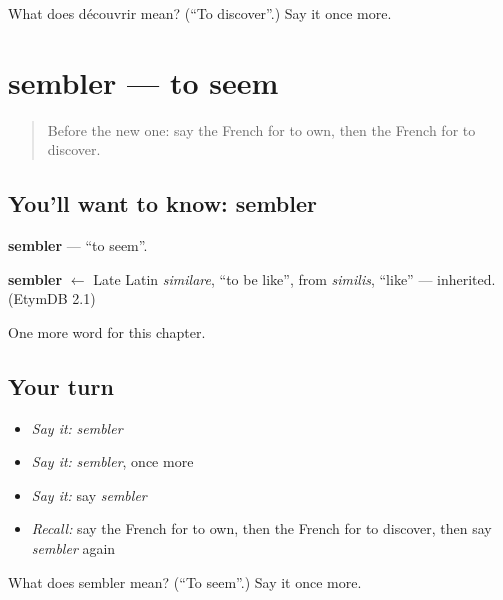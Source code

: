 \begin{tcolorbox}[breakable,colback=teal!4,colframe=teal!35!black,title={Before you move on}]
What does découvrir mean? (\textquotedblleft{}To discover\textquotedblright{}.) Say it once more.
\end{tcolorbox}
\section[sembler]{sembler — to seem}

\label{lesson:FR-C149-sembler}



\begin{quote}
Before the new one: say the French for to own, then the French for to discover.
\end{quote}

\subsection*{You'll want to know: sembler}
\textbf{sembler} — \textquotedblleft{}to seem\textquotedblright{}.

\begin{cousinweb}
\textbf{sembler} $\leftarrow$ Late Latin \emph{similare}, \textquotedblleft{}to be like\textquotedblright{}, from \emph{similis}, \textquotedblleft{}like\textquotedblright{} — inherited. (EtymDB 2.1)
\end{cousinweb}

\begin{grammarlens}[title={What you've built}]
One more word for this chapter.
\end{grammarlens}

\subsection*{Your turn}
\begin{itemize}
\raggedright
  \item \emph{Say it:} \emph{sembler}
  \item \emph{Say it:} \emph{sembler}, once more
  \item \emph{Say it:} say \emph{sembler}
  \item \emph{Recall:} say the French for to own, then the French for to discover, then say \emph{sembler} again
\end{itemize}

\begin{tcolorbox}[breakable,colback=teal!4,colframe=teal!35!black,title={Before you move on}]
What does sembler mean? (\textquotedblleft{}To seem\textquotedblright{}.) Say it once more.
\end{tcolorbox}
